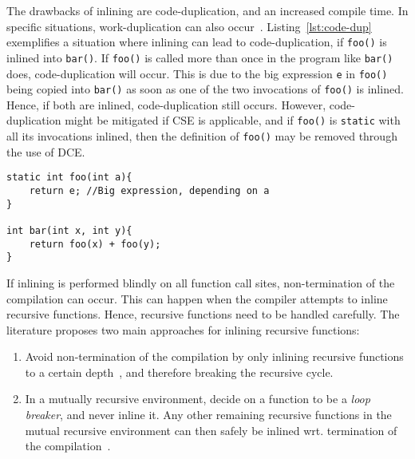 The drawbacks of inlining are code-duplication, and an increased compile time.
In specific situations, work-duplication can also occur~\cite{GHCPaper}.
Listing~\ref{lst:code-dup} exemplifies a situation where inlining can lead to
code-duplication, if \lstinline!foo()! is inlined into \lstinline!bar()!. If
\lstinline!foo()! is called more than once in the program like \lstinline!bar()!
does, code-duplication will occur. This is due to the big expression
\lstinline!e! in \lstinline!foo()! being copied into \lstinline!bar()! as soon
as one of the two invocations of \lstinline!foo()! is inlined. Hence, if both
are inlined, code-duplication still occurs. However, code-duplication might be
mitigated if CSE is applicable, and if \lstinline!foo()! is \lstinline!static!
with all its invocations inlined, then the definition of \lstinline!foo()! may
be removed through the use of DCE.

\begin{centering}
	\noindent\begin{minipage}{\textwidth}
		\begin{CenteredBox}
		\begin{lstlisting}[style=global_customcpp]
static int foo(int a){
	return e; //Big expression, depending on a
}

int bar(int x, int y){
	return foo(x) + foo(y);
}
		\end{lstlisting}
		\end{CenteredBox}
	\end{minipage}
	\label{lst:code-dup}
\end{centering}

If inlining is performed blindly on all function call sites, non-termination of
the compilation can occur. This can happen when the compiler attempts to inline
recursive functions. Hence, recursive functions need to be handled carefully.
The literature proposes two main approaches for inlining recursive functions:

\begin{enumerate}

	\item Avoid non-termination of the compilation by only inlining recursive
functions to a certain depth~\cite{GHCPaper}\cite{InlineWhenHowSerrano}, and
therefore breaking the recursive cycle.

    \item In a mutually recursive environment, decide on a function to be a
\textit{loop breaker}, and never inline it. Any other remaining recursive
functions in the mutual recursive environment can then safely be inlined wrt.
termination of the compilation~\cite{BasMscThesis}\cite{GHCPaper}.

\end{enumerate}

